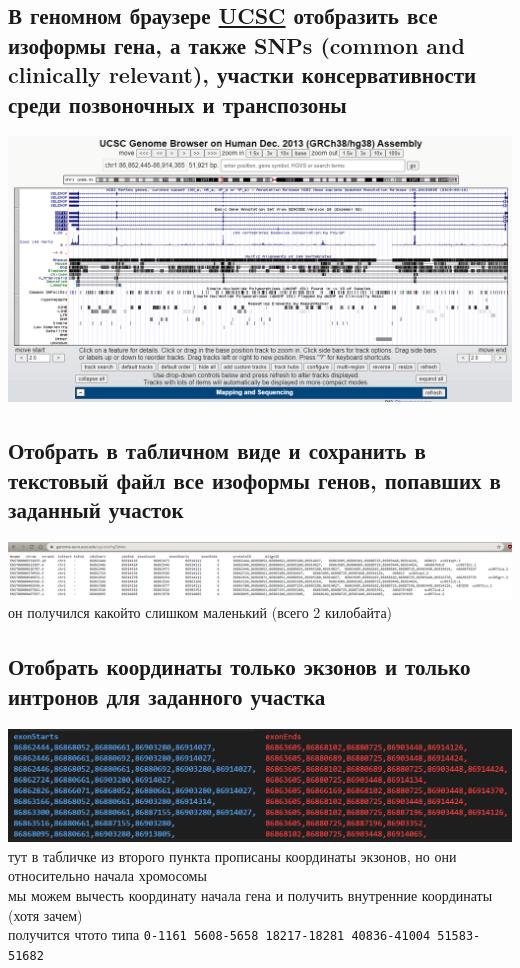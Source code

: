 \documentclass{article}
\begin{document}
  \subsection{В геномном браузере \href{https://genome-euro.ucsc.edu/cgi-bin/hgTracks?db=hg38&position=chr1\%3A86862445\%2D86914365}{UCSC} отобразить все изоформы гена, а также SNPs (common and clinically relevant), участки консервативности среди позвоночных и транспозоны}
  \includegraphics[width=\textwidth]{./bio/hw1/gene_common.png}

  \subsection{Отобрать в табличном виде и сохранить в текстовый файл все изоформы генов, попавших в заданный участок}
  \includegraphics[width=\textwidth]{./bio/hw1/textfile.png}
  он получился какойто слишком маленький (всего 2 килобайта)

  \subsection{Отобрать координаты только экзонов и только интронов для заданного участка}
  \includegraphics[width=\textwidth]{./bio/hw1/exon.png}
  тут в табличке из второго пункта прописаны координаты экзонов, но они относительно начала хромосомы \\
  мы можем вычесть координату начала гена и получить внутренние координаты (хотя зачем) \\
  получится чтото типа \texttt{0-1161 5608-5658 18217-18281 40836-41004 51583-51682}
\end{document}
